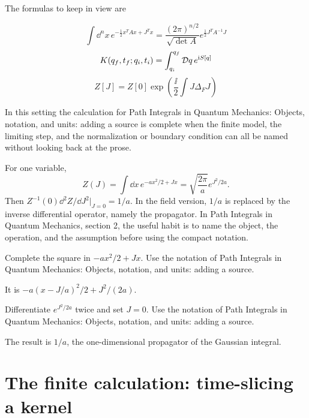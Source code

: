 The formulas to keep in view are

\[
  \int\dd^n x\,e^{-\frac12x^TAx+J^Tx}=\frac{(2\pi)^{n/2}}{\sqrt{\det A}}e^{\frac12J^TA^{-1}J}
\]
\[
  K(q_f,t_f;q_i,t_i)=\int_{q_i}^{q_f}\mathcal D q\,e^{\mathrm i S[q]}
\]
\[
  Z[J]=Z[0]\exp\left(\frac{\ii}{2}\int J\Delta_FJ\right)
\]

In this setting the calculation for Path Integrals in Quantum Mechanics: Objects, notation, and units: adding a source is complete when the finite model, the limiting step, and the normalization or boundary condition can all be named without looking back at the prose.




\begin{example}
For one variable,
\[
  Z(J)=\int\dd x\,e^{-ax^2/2+Jx}
  =\sqrt{\frac{2\pi}{a}}e^{J^2/2a}.
\]
Then \(Z^{-1}(0)\dd^2Z/\dd J^2|_{J=0}=1/a\).  In the field version, \(1/a\) is replaced by the inverse differential operator, namely the propagator.  In Path Integrals in Quantum Mechanics, section 2, the useful habit is to name the object, the operation, and the assumption before using the compact notation.
\end{example}



\begin{exercise}
Complete the square in \(-ax^2/2+Jx\).  Use the notation of Path Integrals in Quantum Mechanics: Objects, notation, and units: adding a source.
\begin{answer}
It is \(-a(x-J/a)^2/2+J^2/(2a)\).
\end{answer}
\end{exercise}

\begin{exercise}
Differentiate \(e^{J^2/2a}\) twice and set \(J=0\).  Use the notation of Path Integrals in Quantum Mechanics: Objects, notation, and units: adding a source.
\begin{answer}
The result is \(1/a\), the one-dimensional propagator of the Gaussian integral.
\end{answer}
\end{exercise}



\section{The finite calculation: time-slicing a kernel}


